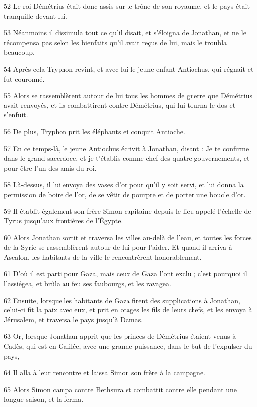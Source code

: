 \par 52 Le roi Démétrius était donc assis sur le trône de son royaume, et le pays était tranquille devant lui.
\par 53 Néanmoins il dissimula tout ce qu'il disait, et s'éloigna de Jonathan, et ne le récompensa pas selon les bienfaits qu'il avait reçus de lui, mais le troubla beaucoup.
\par 54 Après cela Tryphon revint, et avec lui le jeune enfant Antiochus, qui régnait et fut couronné.
\par 55 Alors se rassemblèrent autour de lui tous les hommes de guerre que Démétrius avait renvoyés, et ils combattirent contre Démétrius, qui lui tourna le dos et s'enfuit.
\par 56 De plus, Tryphon prit les éléphants et conquit Antioche.
\par 57 En ce temps-là, le jeune Antiochus écrivit à Jonathan, disant : Je te confirme dans le grand sacerdoce, et je t'établis comme chef des quatre gouvernements, et pour être l'un des amis du roi.
\par 58 Là-dessus, il lui envoya des vases d'or pour qu'il y soit servi, et lui donna la permission de boire de l'or, de se vêtir de pourpre et de porter une boucle d'or.
\par 59 Il établit également son frère Simon capitaine depuis le lieu appelé l'échelle de Tyrus jusqu'aux frontières de l'Égypte.
\par 60 Alors Jonathan sortit et traversa les villes au-delà de l'eau, et toutes les forces de la Syrie se rassemblèrent autour de lui pour l'aider. Et quand il arriva à Ascalon, les habitants de la ville le rencontrèrent honorablement.
\par 61 D'où il est parti pour Gaza, mais ceux de Gaza l'ont exclu ; c'est pourquoi il l'assiégea, et brûla au feu ses faubourgs, et les ravagea.
\par 62 Ensuite, lorsque les habitants de Gaza firent des supplications à Jonathan, celui-ci fit la paix avec eux, et prit en otages les fils de leurs chefs, et les envoya à Jérusalem, et traversa le pays jusqu'à Damas.
\par 63 Or, lorsque Jonathan apprit que les princes de Démétrius étaient venus à Cadès, qui est en Galilée, avec une grande puissance, dans le but de l'expulser du pays,
\par 64 Il alla à leur rencontre et laissa Simon son frère à la campagne.
\par 65 Alors Simon campa contre Bethsura et combattit contre elle pendant une longue saison, et la ferma.
